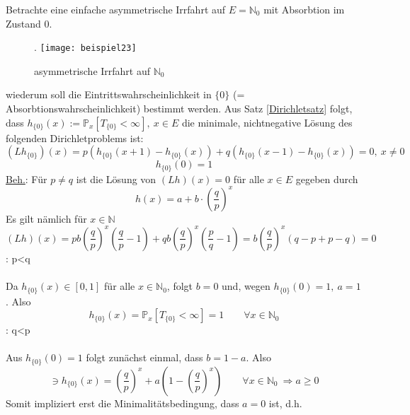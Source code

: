 Betrachte eine einfache asymmetrische Irrfahrt auf $E = \mathbb{N}_{0}$ mit Absorbtion im Zustand 0.
\begin{figure}[H].
\centering
\texttt{[image: beispiel23]}
\caption{asymmetrische Irrfahrt auf $\mathbb{N}_{0}$}
\end{figure}
\noindent
wiederum soll die Eintrittswahrscheinlichkeit in $\lbrace 0 \rbrace$ (= Absorbtionswahrscheinlichkeit) bestimmt werden. Aus Satz \ref{Dirichletsatz} folgt, dass $h_{\lbrace 0 \rbrace}(x) := \mathbb{P}_{x}[T_{\lbrace 0 \rbrace} < \infty], \: x \in E$ die minimale, nichtnegative Lösung des folgenden Dirichletproblems ist:
\begin{equation*}
(Lh_{\lbrace 0 \rbrace})(x) = p(h_{\lbrace 0 \rbrace}(x+1) - h_{\lbrace 0 \rbrace}(x)) + q(h_{\lbrace 0 \rbrace}(x-1) - h_{\lbrace 0 \rbrace}(x)) = 0, \: x \neq 0
\end{equation*}
\begin{equation*}
h_{\lbrace 0 \rbrace}(0) = 1
\end{equation*}
\underline{Beh.}: Für $p \neq q$ ist die Lösung von $(Lh)(x) = 0$ für alle $x \in E$ gegeben durch
\begin{equation*}
h(x) = a + b \cdot (\dfrac{q}{p})^{x}
\end{equation*}
Es gilt nämlich für $x \in \mathbb{N}$
\begin{equation*}
(Lh)(x) = pb (\dfrac{q}{p})^{x}(\dfrac{q}{p} - 1) + qb (\dfrac{q}{p})^{x} (\dfrac{p}{q} - 1) = b (\dfrac{q}{p})^{x}(q-p + p-q) = 0
\end{equation*}
: p<q
\\
\\
Da $h_{\lbrace 0 \rbrace}(x) \in [0,1]$ für alle $x \in \mathbb{N}_{0}$, folgt $b=0$ und, wegen $h_{\lbrace 0 \rbrace}(0) = 1, \: a=1$. Also
\begin{equation*}
h_{\lbrace 0 \rbrace}(x) = \mathbb{P}_{x}[T_{\lbrace 0 \rbrace} < \infty] = 1 \qquad \forall x \in \mathbb{N}_{0}
\end{equation*}
: q<p
\\
\\
Aus $h_{\lbrace 0 \rbrace}(0) = 1$ folgt zunächst einmal, dass $b = 1-a$. Also
\begin{equation*}
[0,1] \ni h_{\lbrace 0 \rbrace}(x) = (\dfrac{q}{p})^{x} + a(1- (\dfrac{q}{p})^{x}) \qquad \forall x \in \mathbb{N}_{0} \: \Rightarrow a \geq 0
\end{equation*}
Somit impliziert erst die Minimalitätsbedingung, dass $a=0$ ist, d.h.
